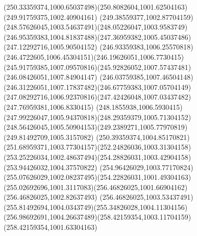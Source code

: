 {{		\curveto(250.33359374,1000.65037498)(250.8082604,1001.62504163)(249.91759375,1002.40904161)
		\curveto(249.38559377,1002.87704159)(248.57626045,1003.54637491)(248.05226047,1003.9583749)
		\curveto(246.95359383,1004.81837488)(247.36959382,1005.45037486)(247.12292716,1005.90504152)
		\curveto(246.93359383,1006.25570818)(246.4722605,1006.45304151)(246.19626051,1006.7730415)
		\curveto(245.91759385,1007.09570816)(245.92826052,1007.57437481)(246.08426051,1007.84904147)
		\curveto(246.03759385,1007.46504148)(246.31226051,1007.17837482)(246.67759383,1007.05704149)
		\curveto(247.08292716,1006.92370816)(247.42426048,1007.03437482)(247.76959381,1006.8330415)
		\curveto(248.1855938,1006.5930415)(247.99226047,1005.94370818)(248.29359379,1005.71304152)
		\curveto(248.56426045,1005.50904153)(249.2389271,1005.77970819)(249.81492709,1005.3157082)
		\curveto(250.39359374,1004.85170821)(251.68959371,1003.77304157)(252.24826036,1003.31304158)
		\curveto(253.25226034,1002.48637494)(254.28826031,1003.42904158)(253.94426032,1004.37570822)
		\curveto(254.96426029,1003.77170824)(255.07626029,1002.08237495)(254.22826031,1001.49304163)
		\curveto(255.02692696,1001.3117083)(256.46826025,1001.66904162)(256.46826025,1002.82637493)
		\curveto(256.46826025,1003.53437491)(255.81492694,1004.0343749)(255.34826028,1004.11304156)
		\curveto(256.98692691,1004.26637489)(258.42159354,1003.11704159)(258.42159354,1001.63304163)
	}
}